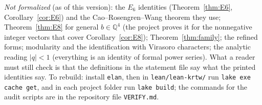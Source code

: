 \documentclass[11pt]{amsart}
\theoremstyle{definition}
\numberwithin{equation}{section}
\newcommand{\Q}{\mathbb{Q}}
\newcommand{\fpath}[1]{\nolinkurl{#1}}
\begin{document}
\emph{Not formalized} (as of this version): the $E_6$ identities (Theorem~\ref{thm:E6}, Corollary~\ref{cor:E6})
and the Cao--Rosengren--Wang theorem they use; Theorem~\ref{thm:E8} for general $b\in\Q^4$ (the project proves
it for the nonnegative integer vectors that cover Corollary~\ref{cor:E8}); Theorem~\ref{thm:family}; the
refined forms; modularity and the identification with Virasoro characters; the analytic reading $|q|<1$
(everything is an identity of formal power series). What a reader must still check is that the definitions
in the statement file say what the printed identities say. To rebuild: install \texttt{elan}, then in
\fpath{lean/lean-krtw/} run \texttt{lake exe cache get}, and in each project folder run \texttt{lake build};
the commands for the audit scripts are in the repository file \fpath{VERIFY.md}.
\end{document}
